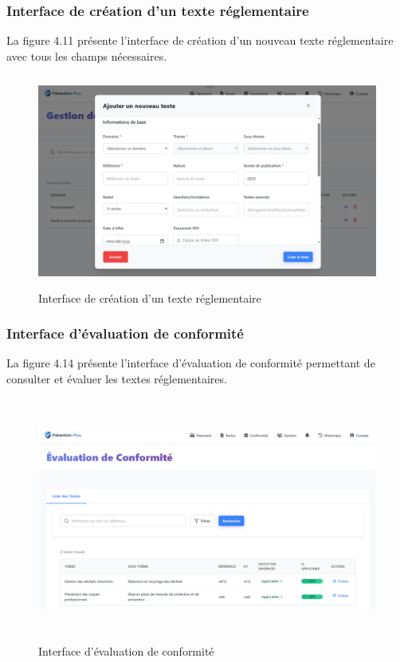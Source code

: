 \subsubsection{Interface de création d'un texte réglementaire}
\noindent La figure 4.11 présente l'interface de création d'un nouveau texte réglementaire avec tous les champs nécessaires.

\begin{figure}[H]
    \centering
    \includegraphics[width=12cm,height=7cm]{images/createtextmodal.PNG}
    \caption{Interface de création d'un texte réglementaire}
\end{figure}

\subsubsection{Interface d'évaluation de conformité}
\noindent La figure 4.14 présente l'interface d'évaluation de conformité permettant de consulter et évaluer les textes réglementaires.

\begin{figure}[H]
    \centering
    \includegraphics[width=13cm,height=8cm]{images/complianceinterface.PNG}
    \caption{Interface d'évaluation de conformité}
\end{figure}

